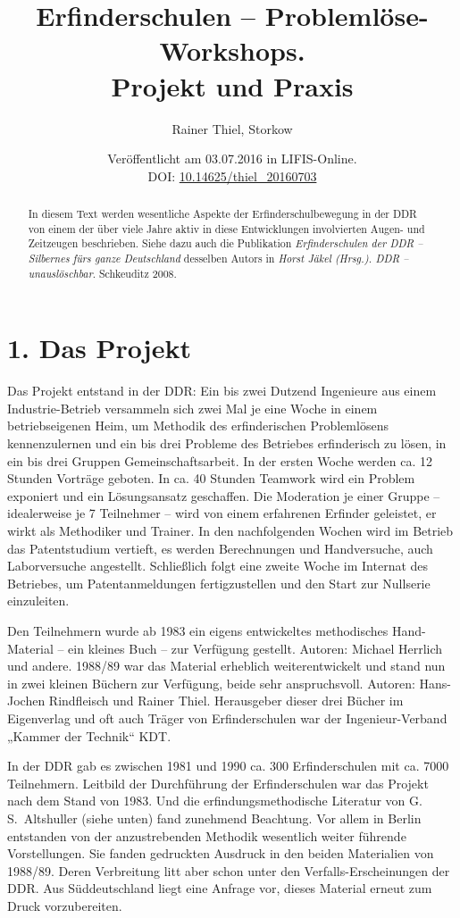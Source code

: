 \documentclass[12pt,a4paper]{article}
\title{Erfinderschulen – Problemlöse-Workshops.\\[6pt] Projekt und Praxis}
\author{Rainer Thiel, Storkow}
\date{Veröffentlicht am 03.07.2016 in LIFIS-Online.\\[4pt] DOI:
  \url{10.14625/thiel_20160703}}
\begin{document}
\maketitle
\begin{abstract}\noindent
  In diesem Text werden wesentliche Aspekte der Erfinderschulbewegung in der
  DDR von einem der über viele Jahre aktiv in diese Entwicklungen involvierten
  Augen- und Zeitzeugen beschrieben.  Siehe dazu auch die Publikation
  \emph{Erfinderschulen der DDR -- Silbernes fürs ganze Deutschland} desselben
  Autors in \emph{Horst Jäkel (Hrsg.). DDR – unauslöschbar}.  Schkeuditz 2008.
\end{abstract}

\section*{1. Das Projekt}

Das Projekt entstand in der DDR: Ein bis zwei Dutzend Ingenieure aus einem
Industrie-Betrieb versammeln sich zwei Mal je eine Woche in einem
betriebseigenen Heim, um Methodik des erfinderischen Problemlösens
kennenzulernen und ein bis drei Probleme des Betriebes erfinderisch zu lösen,
in ein bis drei Gruppen Gemeinschaftsarbeit. In der ersten Woche werden ca. 12
Stunden Vorträge geboten. In ca. 40 Stunden Teamwork wird ein Problem exponiert
und ein Lösungsansatz geschaffen. Die Moderation je einer Gruppe – idealerweise
je 7 Teilnehmer – wird von einem erfahrenen Erfinder geleistet, er wirkt als
Methodiker und Trainer. In den nachfolgenden Wochen wird im Betrieb das
Patentstudium vertieft, es werden Berechnungen und Handversuche, auch
Laborversuche angestellt.  Schließlich folgt eine zweite Woche im Internat des
Betriebes, um Patentanmeldungen fertigzustellen und den Start zur Nullserie
einzuleiten.

Den Teilnehmern wurde ab 1983 ein eigens entwickeltes methodisches
Hand-Material -- ein kleines Buch -- zur Verfügung gestellt. Autoren: Michael
Herrlich und andere. 1988/89 war das Material erheblich weiterentwickelt und
stand nun in zwei kleinen Büchern zur Verfügung, beide sehr anspruchsvoll.
Autoren: Hans-Jochen Rindfleisch und Rainer Thiel.  Herausgeber dieser drei
Bücher im Eigenverlag und oft auch Träger von Erfinderschulen war der
Ingenieur-Verband „Kammer der Technik“ KDT.

In der DDR gab es zwischen 1981 und 1990 ca. 300 Erfinderschulen mit ca. 7000
Teilnehmern. Leitbild der Durchführung der Erfinderschulen war das Projekt nach
dem Stand von 1983. Und die erfindungsmethodische Literatur von
G.\,S.~Altshuller (siehe unten) fand zunehmend Beachtung.  Vor allem in Berlin
entstanden von der anzustrebenden Methodik wesentlich weiter führende
Vorstellungen. Sie fanden gedruckten Ausdruck in den beiden Materialien von
1988/89.  Deren Verbreitung litt aber schon unter den Verfalls-Erscheinungen
der DDR. Aus Süddeutschland liegt eine Anfrage vor, dieses Material erneut zum
Druck vorzubereiten.
\end{document}
